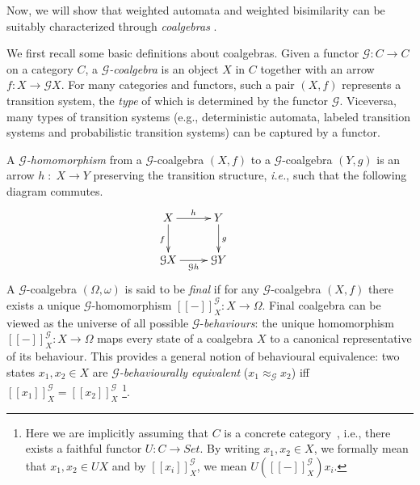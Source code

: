 \documentclass[3p]{elsarticle}
\newcommand{\cbox}[1]{\vspace{0.2cm}\noindent
  \fbox{\parbox{.97\textwidth}{#1}}\vspace{0.2cm}}
\newcommand{\fG}{\mathcal{G}}    %
\newcommand{\beh}[3]{\left[\!\left[ #1 \right]\!\right]^{#2}_{#3}} %
\newcommand{\comp}{\circ}               %
\begin{document}
\bigskip

Now, we will show that weighted automata and weighted bisimilarity
can be suitably characterized through \emph{coalgebras}
\cite{Rutten00}.

We first recall some basic definitions about coalgebras. Given a
functor $\fG\colon  C \to C$ on a category $C$, a {\em
$\fG$-coalgebra} is an object $X$ in $C$ together with an arrow
$f\colon  X \to \fG X$. For many categories and functors, such a pair
$(X,f)$ represents a transition system, the \emph{type} of which is
determined by the functor $\fG$. Viceversa, many types of transition
systems (e.g., deterministic automata, labeled transition systems
and probabilistic transition systems) can be captured by a functor.

A {\em $\fG$-homomorphism\/} from a $\fG$-coalgebra $(X,f)$ to a
$\fG$-coalgebra $(Y,g)$ is an arrow $h\;\colon\; X \to Y$ preserving
the transition structure, {\em
i.e.}, such that %
the following diagram commutes.
\[
\xymatrix{X \ar[d]_{f}\ar[r]^{h}& Y\ar[d]^{g}\\
\fG X \ar[r]_{\fG h}& \fG Y}\ \ \ \ \ \ \ \ \
\]
%
A $\fG$-coalgebra $(\Omega,\omega)$ is said to be {\em final} if for
any $\fG$-coalgebra $(X,f)$ there exists a unique $\fG$-homomorphism
$\beh{-}{\fG}{X} \colon  X\to \Omega$. Final coalgebra can be viewed
as the universe of all possible $\fG$-\emph{behaviours}: the unique
homomorphism $\beh{-}{\fG}{X} \colon X\to \Omega$ maps every state
of a coalgebra $X$ to a canonical representative of its behaviour.
This provides a general notion of behavioural equivalence: two
states $x_1,x_2\in X$ are \emph{$\fG$-behaviourally equivalent}
($x_1 \approx_\fG x_2$) iff $\beh{x_1}{\fG}{X}=\beh{x_2}{\fG}{X}$
\footnote{Here we are implicitly assuming that $C$ is a
concrete category~\cite{ahs:abstract-concrete-cats}, i.e., there exists a faithful
functor $U\colon C \to Set$. By writing $x_1,x_2\in X$, we formally mean that $x_1,x_2\in UX$ and by $\beh{x_i}{\fG}{X}$, we mean $U(\beh{-}{\fG}{X})x_i$.}.


%
\end{document}
